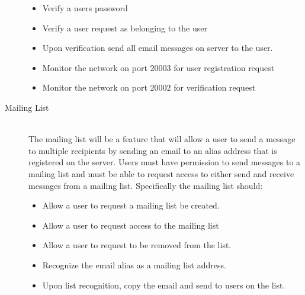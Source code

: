 \documentclass[11pt, letterpaper]{report}
\begin{document}
\begin{description}
\begin{itemize}
\item Verify a users password
\item Verify a user request as belonging to the user
\item Upon verification send all email messages on server to the user.
\item Monitor the network on port 20003 for user registration request
\item Monitor the network on port 20002 for verification request
\end{itemize}
\newpage
\item[Mailing List]\hfill \\
The mailing list will be a feature that will allow a user to send a message to multiple recipients by sending an email to an alias address that is registered on the server. Users must have permission to send messages to a mailing list and must be able to request access to either send and receive messages from a mailing list. Specifically the mailing list should:
\begin{itemize}
\item Allow a user to request a mailing list be created.
\item Allow a user to request access to the mailing list
\item Allow a user to request to be removed from the list.
\item Recognize the email alias as a mailing list address.
\item Upon list recognition, copy the email and send to users on the list.
\end{itemize}


\end{description}
\end{document}
